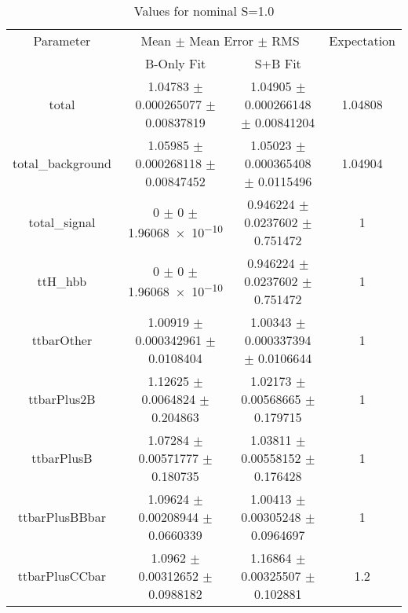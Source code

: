 \begin{table}
\centering
\caption{Values for nominal S=1.0}
\begin{tabular}{cccc}
\toprule
Parameter & \multicolumn{2}{c}{Mean $\pm$ Mean Error $\pm$ RMS} & Expectation\\
 & B-Only Fit & S+B Fit & \\
\midrule
total & \num{1.04783} $\pm$ \num{0.000265077} $\pm$ \num{0.00837819} & \num{1.04905} $\pm$ \num{0.000266148} $\pm$ \num{0.00841204} & \num{1.04808}\\
total\_background & \num{1.05985} $\pm$ \num{0.000268118} $\pm$ \num{0.00847452} & \num{1.05023} $\pm$ \num{0.000365408} $\pm$ \num{0.0115496} & \num{1.04904}\\
total\_signal & \num{0} $\pm$ \num{0} $\pm$ \num{1.96068e-10} & \num{0.946224} $\pm$ \num{0.0237602} $\pm$ \num{0.751472} & \num{1}\\
ttH\_hbb & \num{0} $\pm$ \num{0} $\pm$ \num{1.96068e-10} & \num{0.946224} $\pm$ \num{0.0237602} $\pm$ \num{0.751472} & \num{1}\\
ttbarOther & \num{1.00919} $\pm$ \num{0.000342961} $\pm$ \num{0.0108404} & \num{1.00343} $\pm$ \num{0.000337394} $\pm$ \num{0.0106644} & \num{1}\\
ttbarPlus2B & \num{1.12625} $\pm$ \num{0.0064824} $\pm$ \num{0.204863} & \num{1.02173} $\pm$ \num{0.00568665} $\pm$ \num{0.179715} & \num{1}\\
ttbarPlusB & \num{1.07284} $\pm$ \num{0.00571777} $\pm$ \num{0.180735} & \num{1.03811} $\pm$ \num{0.00558152} $\pm$ \num{0.176428} & \num{1}\\
ttbarPlusBBbar & \num{1.09624} $\pm$ \num{0.00208944} $\pm$ \num{0.0660339} & \num{1.00413} $\pm$ \num{0.00305248} $\pm$ \num{0.0964697} & \num{1}\\
ttbarPlusCCbar & \num{1.0962} $\pm$ \num{0.00312652} $\pm$ \num{0.0988182} & \num{1.16864} $\pm$ \num{0.00325507} $\pm$ \num{0.102881} & \num{1.2}\\
\bottomrule
\end{tabular}
\end{table}